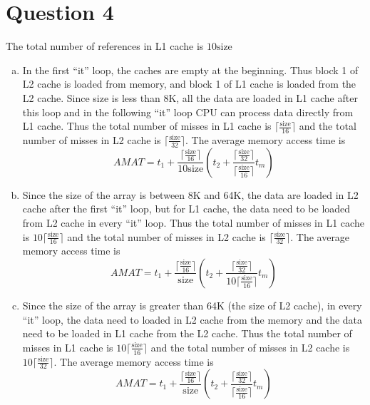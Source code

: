 \documentclass[11pt]{amsart}
\begin{document}
\section*{Question 4}
The total number of references in L1 cache is $10\text{size}$
\begin{enumerate}[(a)]
\item In the first ``it'' loop, the caches are empty at the beginning. Thus block 1 of L2 cache is loaded from memory, and block 1 of L1 cache is loaded from the L2 cache. Since size is less than 8K, all the data are loaded in L1 cache after this loop and in the following ``it'' loop CPU can process data directly from L1 cache. Thus the total number of misses in L1 cache is $\lceil\frac{\text{size}}{16}\rceil$ and the total number of misses in L2 cache is $\lceil\frac{\text{size}}{32}\rceil$. The average memory access time is
$$
AMAT = t_1+\frac{\lceil\frac{\text{size}}{16}\rceil}{10\text{size}}\left(t_2+\frac{\lceil\frac{\text{size}}{32}\rceil}{\lceil\frac{\text{size}}{16}\rceil}t_m\right)
$$
\item Since the size of the array is between 8K and 64K, the data are loaded in L2 cache after the first ``it'' loop, but for L1 cache, the data need to be loaded from L2 cache in every ``it'' loop. Thus the total number of misses in L1 cache is $10\lceil\frac{\text{size}}{16}\rceil$ and the total number of misses in L2 cache is $\lceil\frac{\text{size}}{32}\rceil$. The average memory access time is
$$
AMAT = t_1+\frac{\lceil\frac{\text{size}}{16}\rceil}{\text{size}}\left(t_2+\frac{\lceil\frac{\text{size}}{32}\rceil}{10\lceil\frac{\text{size}}{16}\rceil}t_m\right)
$$
\item Since the size of the array is greater than 64K (the size of L2 cache), in every ``it'' loop, the data need to loaded in L2 cache from the memory and the data need to be loaded in L1 cache from the L2 cache. Thus the total number of misses in L1 cache is $10\lceil\frac{\text{size}}{16}\rceil$ and the total number of misses in L2 cache is $10\lceil\frac{\text{size}}{32}\rceil$. The average memory access time is
$$
AMAT = t_1+\frac{\lceil\frac{\text{size}}{16}\rceil}{\text{size}}\left(t_2+\frac{\lceil\frac{\text{size}}{32}\rceil}{\lceil\frac{\text{size}}{16}\rceil}t_m\right)
$$
\end{enumerate}
\end{document}

